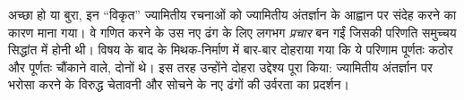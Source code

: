 \documentclass[../../../include/open-logic-section]{subfiles}
\begin{document}
अच्छा हो या बुरा, इन ``विकृत'' ज्यामितीय रचनाओं को ज्यामितीय अंतर्ज्ञान के
आह्वान पर संदेह करने का कारण माना गया। वे गणित करने के उस नए ढंग के लिए
लगभग \emph{प्रचार} बन गईं जिसकी परिणति समुच्चय सिद्धांत में होनी थी। विषय के
बाद के मिथक-निर्माण में बार-बार दोहराया गया कि ये परिणाम पूर्णतः कठोर और
पूर्णतः चौंकाने वाले, दोनों थे। इस तरह उन्होंने दोहरा उद्देश्य पूरा किया:
ज्यामितीय अंतर्ज्ञान पर भरोसा करने के विरुद्ध चेतावनी और सोचने के नए ढंगों
की उर्वरता का प्रदर्शन।
\end{document}
